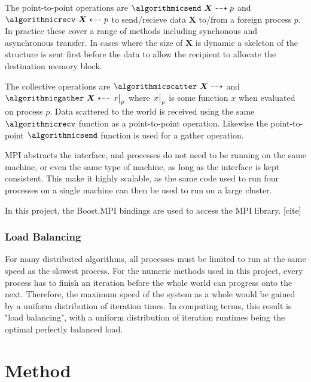 \documentclass[twoside]{IIBproject}
\newcommand{\vect} [1] {\bm{#1}}
\newcommand{\dra}{\dashrightarrow}
\newcommand{\dla}{\dashleftarrow}
\numberwithin{figure}{section}
\begin{document}
            The point-to-point operations are $\algorithmicsend\ \vect{X} \dra p$ and $\algorithmicrecv\ \vect{X} \dla p$ to send/recieve data $\vect{X}$ to/from a foreign process $p$. In practice these cover a range of methods including synchonous and asynchronous transfer. In cases where the size of $\vect{X}$ is dynamic a skeleton of the structure is sent first before the data to allow the recipient to allocate the destination memory block. 

            The collective operations are $\algorithmicscatter\ \vect{X} \dra$ and $\algorithmicgather\ \vect{X} \dla \eval{x}_{p}$ where $\eval{x}_p$ is some function $x$ when evaluated on process $p$. Data scattered to the world is received using the same $\algorithmicrecv$ function as a point-to-point operation. Likewise the point-to-point $\algorithmicsend$ function is used for a gather operation.

            MPI abstracts the interface, and processes do not need to be running on the same machine, or even the same type of machine, as long as the interface is kept consistent. This make it highly scalable, as the same code used to run four processes on a single machine can then be used to run on a large cluster. 

            In this project, the Boost.MPI bindings are used to access the MPI library. [cite]



        \subsubsection{Load Balancing} %
            \label{sec:loadbalancing}

            For many distributed algorithms, all processes must be limited to run at the same speed as the slowest process. For the numeric methods used in this project, every process has to finish an iteration before the whole world can progress onto the next. Therefore, the maximum speed of the system as a whole would be gained by a uniform distribution of iteration times. In computing terms, this result is "load balancing", with a uniform distribution of iteration runtimes being the optimal perfectly balanced load. 





\section{Method} %
    \label{sec:method}
\end{document}
